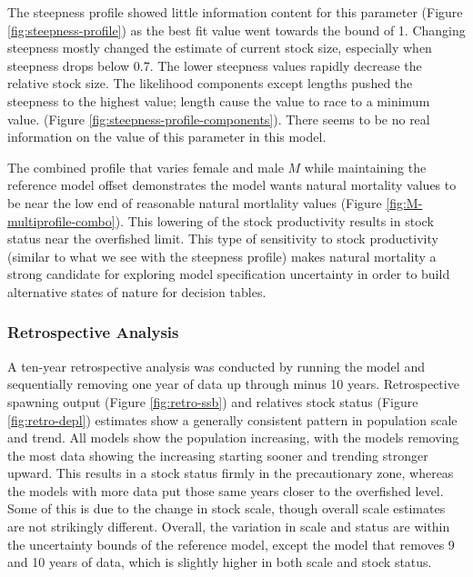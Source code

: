 \documentclass[11pt,
  english,
  letterpaper,
]{article}
\begin{document}
The steepness profile showed little information content for this parameter (Figure \ref{fig:steepness-profile}) as the best fit value went towards the bound of 1. Changing steepness mostly changed the estimate of current stock size, especially when steepness drops below 0.7. The lower steepness values rapidly decrease the relative stock size. The likelihood components except lengths pushed the steepness to the highest value; length cause the value to race to a minimum value. (Figure \ref{fig:steepness-profile-components}). There seems to be no real information on the value of this parameter in this model.

The combined profile that varies female and male \(M\) while maintaining the reference model offset demonstrates the model wants natural mortality values to be near the low end of reasonable natural mortlality values (Figure \ref{fig:M-multiprofile-combo}). This lowering of the stock productivity results in stock status near the overfished limit. This type of sensitivity to stock productivity (similar to what we see with the steepness profile) makes natural mortality a strong candidate for exploring model specification uncertainty in order to build alternative states of nature for decision tables.

\hypertarget{retrospective-analysis}{%
\subsubsection{Retrospective Analysis}\label{retrospective-analysis}}

A ten-year retrospective analysis was conducted by running the model and sequentially removing one year of data up through minus 10 years. Retrospective spawning output (Figure \ref{fig:retro-ssb}) and relatives stock status (Figure \ref{fig:retro-depl}) estimates show a generally consistent pattern in population scale and trend. All models show the population increasing, with the models removing the most data showing the increasing starting sooner and trending stronger upward. This results in a stock status firmly in the precautionary zone, whereas the models with more data put those same years closer to the overfished level. Some of this is due to the change in stock scale, though overall scale estimates are not strikingly different. Overall, the variation in scale and status are within the uncertainty bounds of the reference model, except the model that removes 9 and 10 years of data, which is slightly higher in both scale and stock status.
\end{document}
